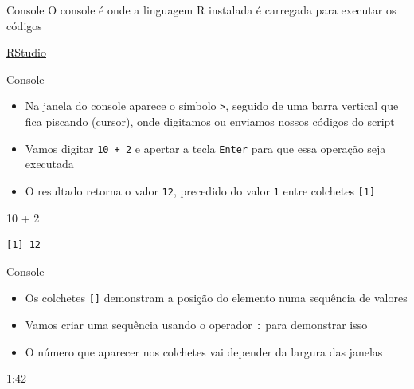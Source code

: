\documentclass[
  ignorenonframetext,
]{beamer}
\newenvironment{Shaded}{\begin{snugshade}}{\end{snugshade}}
\newcommand{\DecValTok}[1]{\textcolor[rgb]{0.68,0.00,0.00}{#1}}
\newcommand{\SpecialCharTok}[1]{\textcolor[rgb]{0.37,0.37,0.37}{#1}}
\begin{document}
\begin{frame}[fragile]{}
\protect\hypertarget{section}{}
\begin{block}{Console}
\protect\hypertarget{console}{}
O console é onde a linguagem R instalada é carregada para executar os
códigos

\href{https://www.rstudio.com/}{RStudio}
\end{block}

\begin{block}{Console}
\protect\hypertarget{console-1}{}
\begin{itemize}
\item
  Na janela do console aparece o símbolo \texttt{\textgreater{}},
  seguido de uma barra vertical \texttt{\textbar{}} que fica piscando
  (cursor), onde digitamos ou enviamos nossos códigos do script
\item
  Vamos digitar \texttt{10\ +\ 2} e apertar a tecla \texttt{Enter} para
  que essa operação seja executada
\item
  O resultado retorna o valor \texttt{12}, precedido do valor \texttt{1}
  entre colchetes \texttt{{[}1{]}}
\end{itemize}

\begin{Shaded}
\begin{Highlighting}[]
\DecValTok{10} \SpecialCharTok{+} \DecValTok{2}
\end{Highlighting}
\end{Shaded}

\begin{verbatim}
[1] 12
\end{verbatim}
\end{block}

\begin{block}{Console}
\protect\hypertarget{console-2}{}
\begin{itemize}
\item
  Os colchetes \texttt{{[}{]}} demonstram a posição do elemento numa
  sequência de valores
\item
  Vamos criar uma sequência usando o operador \texttt{:} para demonstrar
  isso
\item
  O número que aparecer nos colchetes vai depender da largura das
  janelas
\end{itemize}

\begin{Shaded}
\begin{Highlighting}[]
\DecValTok{1}\SpecialCharTok{:}\DecValTok{42}
\end{Highlighting}
\end{Shaded}


\end{block}
\end{frame}
\end{document}
